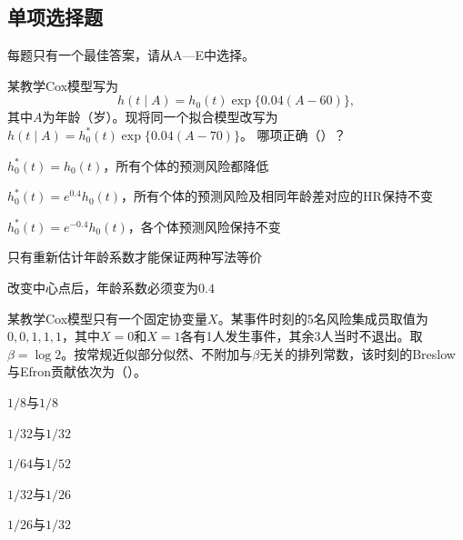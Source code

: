 \subsection{单项选择题}
每题只有一个最佳答案，请从A—E中选择。

\par\noindent\begin{minipage}{\linewidth}
某教学Cox模型写为
\[
h(t\mid A)=h_0(t)\exp\{0.04(A-60)\},
\]
其中$A$为年龄（岁）。现将同一个拟合模型改写为
$h(t\mid A)=h_0^*(t)\exp\{0.04(A-70)\}$。
哪项正确（\quad）？
\begin{choices}
\item $h_0^*(t)=h_0(t)$，所有个体的预测风险都降低
\item $h_0^*(t)=e^{0.4}h_0(t)$，所有个体的预测风险及相同年龄差对应的HR保持不变
\item $h_0^*(t)=e^{-0.4}h_0(t)$，各个体预测风险保持不变
\item 只有重新估计年龄系数才能保证两种写法等价
\item 改变中心点后，年龄系数必须变为$0.4$
\end{choices}
\end{minipage}\par\medskip

\par\noindent\begin{minipage}{\linewidth}
某教学Cox模型只有一个固定协变量$X$。某事件时刻的5名风险集成员取值为$0,0,1,1,1$，其中$X=0$和$X=1$各有1人发生事件，其余3人当时不退出。取$\beta=\log2$。按常规近似部分似然、不附加与$\beta$无关的排列常数，该时刻的Breslow与Efron贡献依次为（\quad）。
\begin{choices}
\item $1/8$与$1/8$
\item $1/32$与$1/32$
\item $1/64$与$1/52$
\item $1/32$与$1/26$
\item $1/26$与$1/32$
\end{choices}
\end{minipage}\par\medskip

